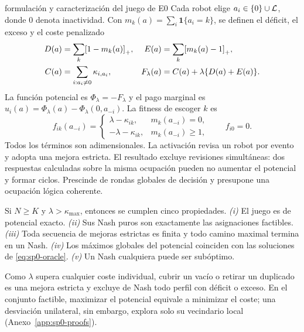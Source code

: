 \begin{contribucion}{formulación y caracterización del juego de E0}
Cada robot elige $a_i\in\{0\}\cup\mathcal{L}$, donde $0$ denota inactividad. Con $m_k(a)=\sum_i\mathbf1\{a_i=k\}$, se definen el déficit, el exceso y el coste penalizado
\begin{equation}
\begin{aligned}
 D(a)&=\sum_k\mathopen{\textnormal{[}}1-m_k(a)\mathclose{\textnormal{]}}_{+}, &
 E(a)&=\sum_k\mathopen{\textnormal{[}}m_k(a)-1\mathclose{\textnormal{]}}_{+},\\
 C(a)&=\sum_{i:a_i\neq0}\kappa_{i,a_i}, &
 F_\lambda(a)&=C(a)+\lambda\{D(a)+E(a)\}.
\end{aligned}
\label{eq:sp0-penalized-cost}
\end{equation}
La función potencial es $\Phi_\lambda=-F_\lambda$ y el pago marginal es $u_i(a)=\Phi_\lambda(a)-\Phi_\lambda(0,a_{-i})$. La fitness de escoger $k$ es
\begin{equation}
 f_{ik}(a_{-i})=
 \begin{cases}
  \lambda-\kappa_{ik},&m_k(a_{-i})=0,\\
  -\lambda-\kappa_{ik},&m_k(a_{-i})\geq1,
 \end{cases}
 \qquad f_{i0}=0.
 \label{eq:sp0-action-fitness}
\end{equation}
Todos los términos son adimensionales. La activación revisa un robot por evento y adopta una mejora estricta. El resultado excluye revisiones simultáneas: dos respuestas calculadas sobre la misma ocupación pueden no aumentar el potencial y formar ciclos. Prescinde de rondas globales de decisión y presupone una ocupación lógica coherente.

\begin{proposicion}
\label{thm:sp0-nash-characterization}
Si $N\geq K$ y $\lambda>\kappa_{\max}$, entonces se cumplen cinco propiedades. \emph{(i)} El juego es de potencial exacto. \emph{(ii)} Sus Nash puros son exactamente las asignaciones factibles. \emph{(iii)} Toda secuencia de mejoras estrictas es finita y todo camino maximal termina en un Nash. \emph{(iv)} Los máximos globales del potencial coinciden con las soluciones de \eqref{eq:sp0-oracle}. \emph{(v)} Un Nash cualquiera puede ser subóptimo.
\end{proposicion}
\end{contribucion}
Como \(\lambda\) supera cualquier coste individual, cubrir un vacío o retirar un duplicado es una mejora estricta y excluye de Nash todo perfil con déficit o exceso. En el conjunto factible, maximizar el potencial equivale a minimizar el coste; una desviación unilateral, sin embargo, explora solo su vecindario local (Anexo~\ref{app:sp0-proofs}).

